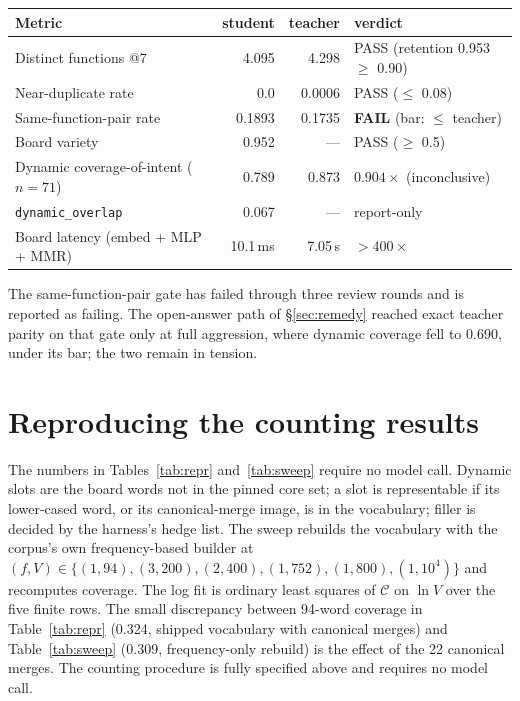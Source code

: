 \documentclass{article}
\newcommand{\covv}{\mathcal{C}}
\begin{document}
\begin{center}
\small
\begin{tabular}{@{}lrrl@{}}
\toprule
Metric & student & teacher & verdict \\
\midrule
Distinct functions @7 & 4.095 & 4.298 & PASS (retention 0.953 $\ge$ 0.90) \\
Near-duplicate rate & 0.0 & 0.0006 & PASS ($\le$ 0.08) \\
Same-function-pair rate & 0.1893 & 0.1735 & \textbf{FAIL} (bar: $\le$ teacher) \\
Board variety & 0.952 & --- & PASS ($\ge$ 0.5) \\
Dynamic coverage-of-intent ($n=71$) & 0.789 & 0.873 & $0.904\times$ (inconclusive) \\
\texttt{dynamic\_overlap} & 0.067 & --- & report-only \\
Board latency (embed + MLP + MMR) & 10.1\,ms & 7.05\,s & ${>}400\times$ \\
\bottomrule
\end{tabular}
\end{center}
The same-function-pair gate has failed through three review rounds and is
reported as failing. The open-answer path of \S\ref{sec:remedy} reached exact
teacher parity on that gate only at full aggression, where dynamic
coverage fell to 0.690, under its bar; the two remain in tension.

\section{Reproducing the counting results}
\label{app:repro}
The numbers in Tables~\ref{tab:repr} and~\ref{tab:sweep} require no model
call. Dynamic slots are the board words not in the pinned core set; a slot is
representable if its lower-cased word, or its canonical-merge image, is in the
vocabulary; filler is decided by the harness's hedge list. The sweep rebuilds
the vocabulary with the corpus's own frequency-based builder at
$(f,V)\in\{(1,94),(3,200),(2,400),(1,752),(1,800),(1,10^4)\}$ and recomputes
coverage. The log fit is ordinary least squares of $\covv$ on $\ln V$ over the
five finite rows. The small discrepancy between 94-word coverage in
Table~\ref{tab:repr} (0.324, shipped vocabulary with canonical merges) and
Table~\ref{tab:sweep} (0.309, frequency-only rebuild) is the effect of the 22
canonical merges. The counting procedure is fully specified above and requires no model call.
\end{document}
